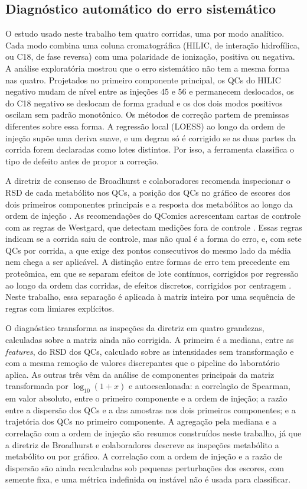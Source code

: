 \subsection{Diagnóstico automático do erro sistemático}

O estudo usado neste trabalho tem quatro corridas, uma por modo analítico. Cada modo combina uma coluna cromatográfica (HILIC, de interação hidrofílica, ou C18, de fase reversa) com uma polaridade de ionização, positiva ou negativa. A análise exploratória mostrou que o erro sistemático não tem a mesma forma nas quatro. Projetados no primeiro componente principal, os QCs do HILIC negativo mudam de nível entre as injeções 45 e 56 e permanecem deslocados, os do C18 negativo se deslocam de forma gradual e os dos dois modos positivos oscilam sem padrão monotônico. Os métodos de correção partem de premissas diferentes sobre essa forma. A regressão local (LOESS) ao longo da ordem de injeção supõe uma deriva suave, e um degrau só é corrigido se as duas partes da corrida forem declaradas como lotes distintos. Por isso, a ferramenta classifica o tipo de defeito antes de propor a correção.

A diretriz de consenso de Broadhurst e colaboradores recomenda inspecionar o RSD de cada metabólito nos QCs, a posição dos QCs no gráfico de escores dos dois primeiros componentes principais e a resposta dos metabólitos ao longo da ordem de injeção \cite{broadhurst2018guidelines}. As recomendações do QComics acrescentam cartas de controle com as regras de Westgard, que detectam medições fora de controle \cite{doi:10.1021/acs.analchem.3c03660}. Essas regras indicam se a corrida saiu de controle, mas não qual é a forma do erro, e, com sete QCs por corrida, a que exige dez pontos consecutivos do mesmo lado da média nem chega a ser aplicável. A distinção entre formas de erro tem precedente em proteômica, em que se separam efeitos de lote contínuos, corrigidos por regressão ao longo da ordem das corridas, de efeitos discretos, corrigidos por centragem \cite{cuklina2021diagnostics}. Neste trabalho, essa separação é aplicada à matriz inteira por uma sequência de regras com limiares explícitos.

O diagnóstico transforma as inspeções da diretriz em quatro grandezas, calculadas sobre a matriz ainda não corrigida. A primeira é a mediana, entre as \emph{features}, do RSD dos QCs, calculado sobre as intensidades sem transformação e com a mesma remoção de valores discrepantes que o pipeline do laboratório aplica. As outras três vêm da análise de componentes principais da matriz transformada por \(\log_{10}(1 + x)\) e autoescalonada: a correlação de Spearman, em valor absoluto, entre o primeiro componente e a ordem de injeção; a razão entre a dispersão dos QCs e a das amostras nos dois primeiros componentes; e a trajetória dos QCs no primeiro componente. A agregação pela mediana e a correlação com a ordem de injeção são resumos construídos neste trabalho, já que a diretriz de Broadhurst e colaboradores descreve as inspeções metabólito a metabólito ou por gráfico. A correlação com a ordem de injeção e a razão de dispersão são ainda recalculadas sob pequenas perturbações dos escores, com semente fixa, e uma métrica indefinida ou instável não é usada para classificar.

